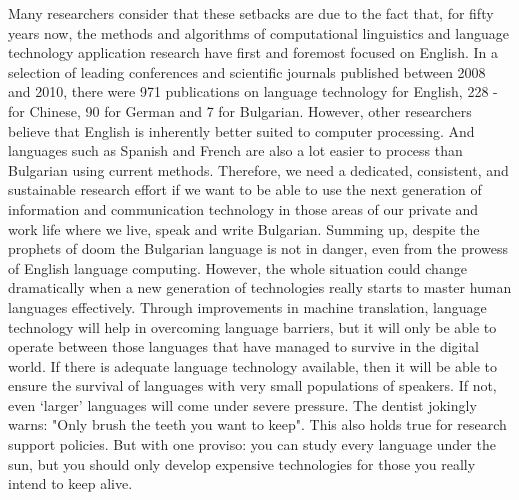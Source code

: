 \begin{multicols}{2}
Many researchers consider that these setbacks are due to the fact that, for fifty years now, the methods and algorithms of computational linguistics and language technology application research have first and foremost focused on English. In a selection of leading conferences and scientific journals published between 2008 and 2010, there were 971 publications on language technology for English, 228 - for Chinese, 90 for German and 7 for Bulgarian. However, other researchers believe that English is inherently better suited to computer processing. And languages such as Spanish and French are also a lot easier to process than Bulgarian using current methods.
Therefore, we need a dedicated, consistent, and sustainable research effort if we want to be able to use the next generation of information and communication technology in those areas of our private and work life where we live, speak and write Bulgarian.
Summing up, despite the prophets of doom the Bulgarian language is not in danger, even from the prowess of English language computing. However, the whole situation could change dramatically when a new generation of technologies really starts to master human languages effectively. 
Through improvements in machine translation, language technology will help in overcoming language barriers, but it will only be able to operate between those languages that have managed to survive in the digital world. If there is adequate language technology available, then it will be able to ensure the survival of languages with very small populations of speakers. If not, even ‘larger’ languages will come under severe pressure. 
The dentist jokingly warns: "Only brush the teeth you want to keep". This also holds true for research support policies. But with one proviso: you can study every language under the sun, but you should only develop expensive technologies for those you really intend to keep alive.  



\end{multicols}
